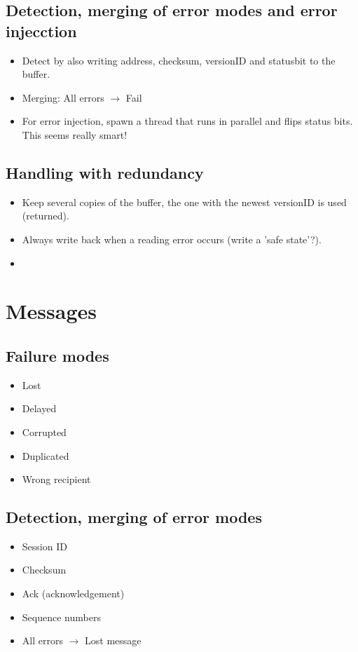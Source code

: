 \subsection{Detection, merging of error modes and error injecction}
\begin{itemize}
    \item Detect by also writing address, checksum, versionID and statusbit to the buffer.
    \item Merging: All errors $\rightarrow$ Fail
    \item For error injection, spawn a thread that runs in parallel and flips status bits. This seems really smart!
\end{itemize}
\subsection{Handling with redundancy}
\begin{itemize}
    \item Keep several copies of the buffer, the one with the newest versionID is used (returned).
    \item Always write back when a reading error occurs (write a 'safe state'?).
    \item 
\end{itemize}
\section{Messages}
\subsection{Failure modes}
\begin{itemize}
    \item Lost
    \item Delayed
    \item Corrupted
    \item Duplicated
    \item Wrong recipient
\end{itemize}

\subsection{Detection, merging of error modes}
\begin{itemize}
    \item Session ID
    \item Checksum
    \item Ack (acknowledgement)
    \item Sequence numbers
    \item All errors $\rightarrow$ Lost message
\end{itemize}

